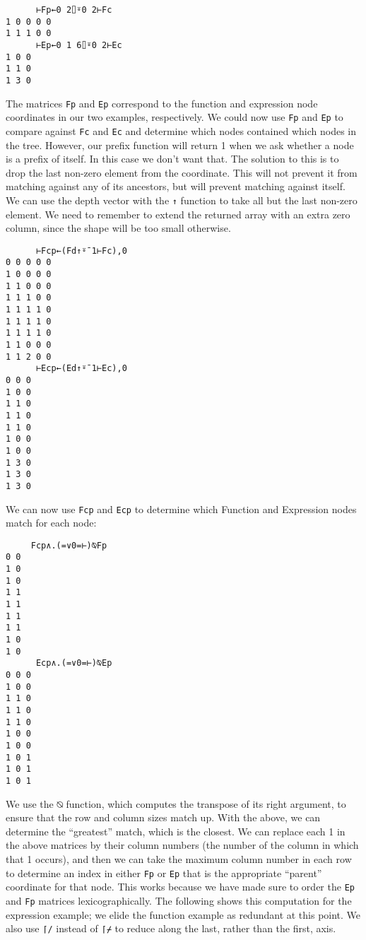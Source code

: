 \documentclass[numbers,preprint]{sigplanconf}
\begin{document}
\begin{verbatim}
      ⊢Fp←0 2⌷⍤0 2⊢Fc
1 0 0 0 0
1 1 1 0 0
      ⊢Ep←0 1 6⌷⍤0 2⊢Ec
1 0 0
1 1 0
1 3 0
\end{verbatim}

The matrices \verb;Fp; and \verb;Ep; correspond to the function and expression
node coordinates in our two examples, respectively. We could now
use \verb;Fp; and \verb;Ep; to compare against \verb;Fc; and \verb;Ec; and determine which nodes
contained which nodes in the tree. However, our prefix function will
return 1 when we ask whether a node is a prefix of itself. In this
case we don’t want that. The solution to this is to drop the last
non-zero element from the coordinate. This will not prevent it from
matching against any of its ancestors, but will prevent matching
against itself. We can use the depth vector with the \verb;↑; function to
take all but the last non-zero element. We need to remember to extend
the returned array with an extra zero column, since the shape will
be too small otherwise.

\begin{verbatim}
      ⊢Fcp←(Fd↑⍤¯1⊢Fc),0
0 0 0 0 0
1 0 0 0 0
1 1 0 0 0
1 1 1 0 0
1 1 1 1 0
1 1 1 1 0
1 1 1 1 0
1 1 0 0 0
1 1 2 0 0
      ⊢Ecp←(Ed↑⍤¯1⊢Ec),0
0 0 0
1 0 0
1 1 0
1 1 0
1 1 0
1 0 0
1 0 0
1 3 0
1 3 0
1 3 0
\end{verbatim}

We can now use \verb;Fcp; and \verb;Ecp; to determine which Function and Expression
nodes match for each node:

\begin{verbatim}
     Fcp∧.(=∨0=⊢)⍉Fp
0 0
1 0
1 0
1 1
1 1
1 1
1 1
1 0
1 0
      Ecp∧.(=∨0=⊢)⍉Ep
0 0 0
1 0 0
1 1 0
1 1 0
1 1 0
1 0 0
1 0 0
1 0 1
1 0 1
1 0 1
\end{verbatim}

We use the ⍉ function, which computes the transpose of its right
argument, to ensure that the row and column sizes match up. With the
above, we can determine the ``greatest'' match, which is the closest.
We can replace each 1 in the above matrices by their column numbers
(the number of the column in which that 1 occurs), and then we can
take the maximum column number in each row to determine an index in
either \verb;Fp; or \verb;Ep; that is the appropriate ``parent'' coordinate for
that node. This works because we have made sure to order the \verb;Ep; and \verb;Fp;
matrices lexicographically. The following shows this computation for
the expression example; we elide the function example as redundant
at this point. We also use \verb;⌈/; instead of \verb;⌈⌿; to reduce along
the last, rather than the first, axis.
\end{document}
